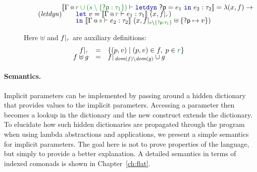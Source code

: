 \begin{figure}
\begin{equation}
\tag{\emph{letdyn}}
\hspace{-0.5em}
\begin{array}{l}
  \sem{\coctx{\Gamma}{\cclrd{r \cup (s \setminus \{ \ident{?p}:\tau_1 \})}} \vdash \kvd{letdyn}~\ident{?p}=e_1~\kvd{in}~e_2 : \tau_2 } =
     \lambda (x, f) \rightarrow \\[-0.25em]
  \qquad\kvd{let}~v=\sem{ \coctx{\Gamma}{\cclrd{r}} \vdash e_1 : \tau_1 }~(x, \restr{f}{\cclrd{r}})\\[-0.25em]
  \qquad\kvd{in}~\sem{ \coctx{\Gamma}{\cclrd{s}} \vdash e_2 : \tau_2 }~
     (x, \restr{f}{\cclrd{s} \setminus \cclrd{\{ \ident{?p}:\tau_1 \}}} \uplus \{ \ident{?p} \mapsto v \} )
\end{array}
\end{equation}
  
\vspace{1em}
{\small Here $\uplus$ and $\restr{f}{\cclrd{r}}$ are auxiliary definitions:}
\begin{equation*}
\begin{array}{rcl}
 \restr{f}{\cclrd{r}} &=& \{ (p,v) \;|\; (p,v) \in f, \;p \in \cclrd{r} \}\\[-0.25em]
 f \uplus g &=& \restr{f}{\, \textit{dom}(f) \setminus \textit{dom}(g)} \cup g 
\end{array}
\end{equation*}

\label{fig:applications-flat-implsem}
\end{figure}


\paragraph{Semantics.}
Implicit parameters can be implemented by passing around a hidden dictionary that provides values
to the implicit parameters. Accessing a parameter then becomes a lookup in the dictionary and
the new  construct extends the dictionary. To elucidate how such hidden dictionaries 
are propagated through the program when using lambda abstractions and applications, we present a 
simple semantics for implicit parameters. The goal here is not to prove properties of the language,
but simply to provide a better explanation. A detailed semantics in terms of indexed comonads is
shown in Chapter~\ref{ch:flat}.


